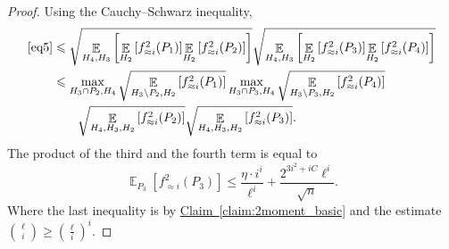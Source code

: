 \documentclass[11pt]{article}
\newcommand{\expref}[2]{\texorpdfstring{\hyperref[#2]{#1~\ref{#2}}}{#1~\ref{#2}}}
\newcommand\Expect[2]{{\mathop{\mathbb{E}}_{#1}\left[ {#2} \right]}}
\renewcommand\geq{\geqslant}
\renewcommand\leq{\leqslant}
\newcommand\approxlvlfn[2]{{#1}_{\approx{#2}}}
\begin{document}
\begin{proof}
Using the Cauchy--Schwarz inequality,
\begin{align}\label{eq6}
\eqref{eq5}
&\leq
\sqrt{\Expect{H_4, H_3}{
\Expect{H_{2}}{\approxlvlfn{f}{i}^2(P_1)}
\Expect{H_{2}}{\approxlvlfn{f}{i}^2(P_2)}}}
\sqrt{\Expect{H_4, H_3}{
\Expect{H_{2}}{\approxlvlfn{f}{i}^2(P_3)}
\Expect{H_{2}}{\approxlvlfn{f}{i}^2(P_4)}}}
\nonumber \\
&\leq
\max_{H_3\cap P_2,H_4}
\sqrt{\Expect{H_3\setminus P_2,H_2}{\approxlvlfn{f}{i}^2(P_1)}}
\max_{H_3\cap P_3, H_4}
\sqrt{\Expect{H_3\setminus P_3, H_{2}}{\approxlvlfn{f}{i}^2(P_4)}}
\nonumber \\
&~~~~~~
\sqrt{
\Expect{H_4,H_3,H_{2}}{\approxlvlfn{f}{i}^2(P_2)}}
\sqrt{
\Expect{H_4,H_3,H_{2}}{\approxlvlfn{f}{i}^2(P_3)}}.
\end{align}
The product of the third and the fourth term is equal to
\[
\Expect{P_3}{\approxlvlfn{f}{i}^2(P_3)}
\leq \frac{\eta \cdot i^i}{\ell^i}+\frac{2^{3i^2+iC} \ell^{i}}{\sqrt{n}}.
\]
Where the last inequality is by \expref{Claim}{claim:2moment_basic} and the estimate ${\ell \choose i}\geq \left(\frac{\ell}{i}\right)^i$.


\end{proof}
\end{document}

